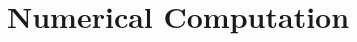 \documentclass[../Maxima_Workbook.tex]{subfiles}
\begin{document}
	
\chapter{Numerical Computation}
\end{document}
